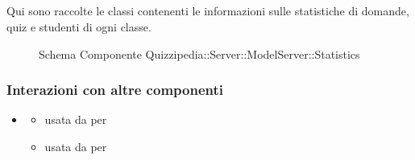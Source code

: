 \subsection{}
Qui sono raccolte le classi contenenti le informazioni sulle statistiche di domande, quiz e studenti di ogni classe.
\begin{figure}[H]
\centering
\noindent{}
\caption[Schema Componente Quizzipedia::Server::ModelServer::Statistics]{Schema Componente Quizzipedia::Server::ModelServer::Statistics}
\end{figure}
\subsubsection{Interazioni con altre componenti}
\begin{itemize}
\item {}
\begin{itemize}
\item usata da  per 
\item usata da  per 
\end{itemize}
\end{itemize}
